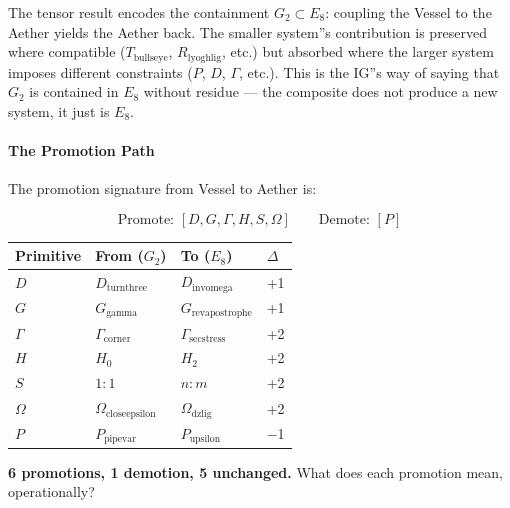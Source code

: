 \documentclass[12pt,a4paper]{article}
\begin{document}
The tensor result encodes the containment $G_2 \subset E_8$: coupling the Vessel to the Aether yields the Aether back. The smaller system''s contribution is preserved where compatible ($T_{\text{bullseye}}$, $R_{\text{lyoghlig}}$, etc.) but absorbed where the larger system imposes different constraints ($P$, $D$, $\Gamma$, etc.). This is the IG''s way of saying that $G_2$ is contained in $E_8$ without residue --- the composite does not produce a new system, it just is $E_8$.

\paragraph{The Promotion Path}

The promotion signature from Vessel to Aether is:

\[\text{Promote: } [D, G, \Gamma, H, S, \Omega] \qquad \text{Demote: } [P]\]

\begin{table}[htbp]
\centering
\small
{}
\begin{tabularx}{\textwidth}{>{\centering\arraybackslash}X >{\centering\arraybackslash}X >{\centering\arraybackslash}X >{\centering\arraybackslash}X}
\toprule
\rowcolor{gray!25}\textbf{Primitive} & \textbf{From ($G_2$)} & \textbf{To ($E_8$)} & \textbf{$\Delta$} \\
\midrule
\rowcolors{1}{white}{gray!10}
$D$ & $D_{\text{turnthree}}$ & $D_{\text{invomega}}$ & +1 \\
$G$ & $G_{\text{gamma}}$ & $G_{\text{revapostrophe}}$ & +1 \\
$\Gamma$ & $\Gamma_{\text{corner}}$ & $\Gamma_{\text{secstress}}$ & +2 \\
$H$ & $H_0$ & $H_2$ & +2 \\
$S$ & $1{:}1$ & $n{:}m$ & +2 \\
$\Omega$ & $\Omega_{\text{closeepsilon}}$ & $\Omega_{\text{dzlig}}$ & +2 \\
$P$ & $P_{\text{pipevar}}$ & $P_{\text{upsilon}}$ & $-$1 \\
\bottomrule
\end{tabularx}
\end{table}

\textbf{6 promotions, 1 demotion, 5 unchanged.} What does each promotion mean, operationally?
\end{document}

